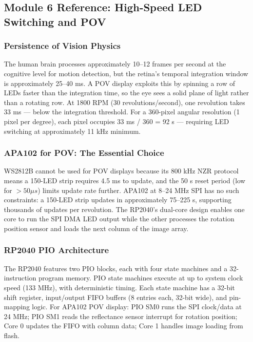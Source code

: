 \documentclass[11pt,letterpaper]{article}
\begin{document}
\subsection{Module 6 Reference: High-Speed LED Switching and POV}

\subsubsection{Persistence of Vision Physics}

The human brain processes approximately 10--12 frames per second at the cognitive level for motion detection, but the retina's temporal integration window is approximately 25--40 ms. A POV display exploits this by spinning a row of LEDs faster than the integration time, so the eye sees a solid plane of light rather than a rotating row. At 1800 RPM (30 revolutions/second), one revolution takes 33 ms --- below the integration threshold. For a 360-pixel angular resolution (1 pixel per degree), each pixel occupies 33 ms / 360 = 92 \textmu s --- requiring LED switching at approximately 11 kHz minimum.

\subsubsection{APA102 for POV: The Essential Choice}

WS2812B cannot be used for POV displays because its 800 kHz NZR protocol means a 150-LED strip requires 4.5 ms to update, and the 50 \textmu s reset period (low for $>50\mu s$) limits update rate further. APA102 at 8--24 MHz SPI has no such constraints: a 150-LED strip updates in approximately 75--225 \textmu s, supporting thousands of updates per revolution. The RP2040's dual-core design enables one core to run the SPI DMA LED output while the other processes the rotation position sensor and loads the next column of the image array.

\subsubsection{RP2040 PIO Architecture}

The RP2040 features two PIO blocks, each with four state machines and a 32-instruction program memory. PIO state machines execute at up to system clock speed (133 MHz), with deterministic timing. Each state machine has a 32-bit shift register, input/output FIFO buffers (8 entries each, 32-bit wide), and pin-mapping logic. For APA102 POV display: PIO SM0 runs the SPI clock/data at 24 MHz; PIO SM1 reads the reflectance sensor interrupt for rotation position; Core 0 updates the FIFO with column data; Core 1 handles image loading from flash.
\end{document}
